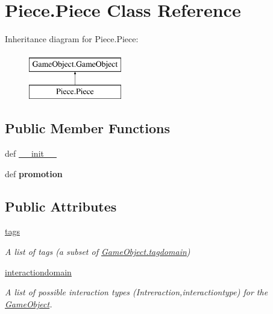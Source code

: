 \hypertarget{classPiece_1_1Piece}{\section{\-Piece.\-Piece \-Class \-Reference}
\label{classPiece_1_1Piece}
}
\-Inheritance diagram for \-Piece.\-Piece\-:\begin{figure}[H]
\begin{center}
\leavevmode
\includegraphics[height=2.000000cm]{classPiece_1_1Piece}
\end{center}
\end{figure}
\subsection*{\-Public \-Member \-Functions}
\begin{DoxyCompactItemize}
\item 
def \hyperlink{classPiece_1_1Piece_a22f15876ed166ab649eee1988ce7de2a}{\-\_\-\-\_\-init\-\_\-\-\_\-}
\item 
\hypertarget{classPiece_1_1Piece_a0215ddeb7f7c9073fcb6c37a53a06c75}{def {\bfseries promotion}}\label{classPiece_1_1Piece_a0215ddeb7f7c9073fcb6c37a53a06c75}

\end{DoxyCompactItemize}
\subsection*{\-Public \-Attributes}
\begin{DoxyCompactItemize}
\item 
\hypertarget{classPiece_1_1Piece_a9a0dd4f786e56223aebeb960b1928e23}{\hyperlink{classPiece_1_1Piece_a9a0dd4f786e56223aebeb960b1928e23}{tags}}\label{classPiece_1_1Piece_a9a0dd4f786e56223aebeb960b1928e23}

\begin{DoxyCompactList}\small\item\em \-A list of tags (a subset of \hyperlink{classGameObject_1_1GameObject_a437572cf73cf761ce7c4e38472bd7015}{\-Game\-Object.\-tagdomain}) \end{DoxyCompactList}\item 
\hyperlink{classPiece_1_1Piece_ad2df134c76a4d099d2644bdaaac6473a}{interactiondomain}
\begin{DoxyCompactList}\small\item\em \-A list of possible interaction types (\-Intreraction,interactiontype) for the \hyperlink{namespaceGameObject}{\-Game\-Object}. \end{DoxyCompactList}\end{DoxyCompactItemize}

